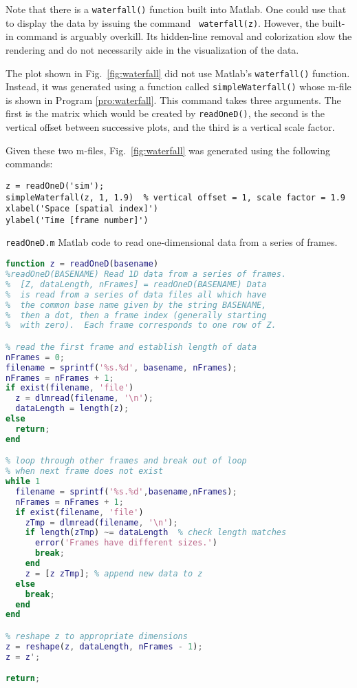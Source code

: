 Note that there is a {\tt waterfall()} function built into Matlab.
One could use that to display the data by issuing the command {\tt
waterfall(z)}.  However, the built-in command is arguably overkill.
Its hidden-line removal and colorization slow the rendering and do not
necessarily aide in the visualization of the data.

The plot shown in Fig.\ \ref{fig:waterfall} did not use Matlab's
{\tt waterfall()} function.  Instead, it was generated using a
function called {\tt simpleWaterfall()} whose m-file is shown in
Program \ref{pro:waterfall}.  This command takes three arguments.  The
first is the matrix which would be created by {\tt readOneD()}, the
second is the vertical offset between successive plots, and the third
is a vertical scale factor.

Given these two m-files, Fig.\ \ref{fig:waterfall} was generated using
the following commands:
\small
\renewcommand{\baselinestretch}{1.0}
\begin{verbatim}
z = readOneD('sim');
simpleWaterfall(z, 1, 1.9)  % vertical offset = 1, scale factor = 1.9
xlabel('Space [spatial index]')
ylabel('Time [frame number]')
\end{verbatim}
\normalsize
\renewcommand{\baselinestretch}{1.0}

\begin{program}
{\tt readOneD.m} Matlab code to read one-dimensional data from a
series of frames. \label{pro:readOneD} 
\codemiddle
\begin{lstlisting}[language=Matlab]
function z = readOneD(basename)
%readOneD(BASENAME) Read 1D data from a series of frames.
%  [Z, dataLength, nFrames] = readOneD(BASENAME) Data
%  is read from a series of data files all which have
%  the common base name given by the string BASENAME,
%  then a dot, then a frame index (generally starting
%  with zero).  Each frame corresponds to one row of Z.

% read the first frame and establish length of data
nFrames = 0;
filename = sprintf('%s.%d', basename, nFrames);
nFrames = nFrames + 1;
if exist(filename, 'file')
  z = dlmread(filename, '\n');
  dataLength = length(z);
else
  return;
end

% loop through other frames and break out of loop
% when next frame does not exist
while 1
  filename = sprintf('%s.%d',basename,nFrames);
  nFrames = nFrames + 1;
  if exist(filename, 'file')
    zTmp = dlmread(filename, '\n');
    if length(zTmp) ~= dataLength  % check length matches
      error('Frames have different sizes.')
      break;
    end
    z = [z zTmp]; % append new data to z
  else
    break;
  end
end

% reshape z to appropriate dimensions
z = reshape(z, dataLength, nFrames - 1);
z = z';

return;
\end{lstlisting}
\end{program}

